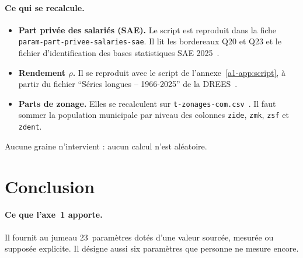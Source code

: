 \paragraph{Ce qui se recalcule.}
\begin{itemize}
\item \textbf{Part privée des salariés (SAE).} Le script est reproduit
  dans la fiche \texttt{param-part-privee-salaries-sae}. Il lit les
  bordereaux Q20 et Q23 et le fichier d'identification des bases
  statistiques SAE 2025~\cite{a1-sae708}.
\item \textbf{Rendement $\rho$.} Il se
  reproduit avec le script de l'annexe~\ref{a1-app:script}, à partir du
  fichier \enquote{Séries longues -- 1966-2025} de la DREES~\cite{a1-drees491}.
\item \textbf{Parts de zonage.} Elles se recalculent sur
  \texttt{t-zonages-com.csv}~\cite{a1-zonagesdatagouv}. Il faut sommer la
  population municipale par niveau des colonnes \texttt{zide},
  \texttt{zmk}, \texttt{zsf} et \texttt{zdent}.
\end{itemize}
Aucune graine n'intervient : aucun calcul n'est aléatoire.

\section{Conclusion}

\paragraph{Ce que l'axe~1 apporte.}
Il fournit au jumeau 23~paramètres dotés d'une valeur sourcée, mesurée ou
supposée explicite. Il désigne aussi six paramètres que personne ne mesure
encore.

